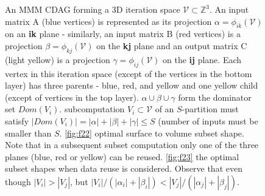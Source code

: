 \documentclass[sigplan,review,anonymous]{acmart}\settopmatter{printfolios=true,printccs=false,printacmref=false}
\begin{document}
\begin{figure}
	\centering
	\hfill
	\hfill
	\caption{\label{fig:f21} An MMM CDAG forming a 3D 
		iteration 
		space $\mathcal{V} \subset \mathbb{Z}^3$. An input 
		matrix A (blue 
		vertices) 
		is represented as 
		its projection $\alpha = \phi_{ik}(\mathcal{V})$
		on 
		an \textbf{ik} plane - similarly, an input matrix B 
		(red vertices) is a 
		projection $\beta = \phi_{kj}(\mathcal{V})$ on the 
		\textbf{kj} plane 
		and an 
		output 
		matrix C (light yellow) 
		is a 
		projection $\gamma = \phi_{ij}(\mathcal{V})$ on the 
		\textbf{ij} plane. 
		Each 
		vertex 
		in this iteration space 
		(except of the vertices in the bottom layer) has 
		three parents - blue, 
		red, 
		and yellow and one yellow child (except of vertices 
		in the top layer). 
		$\alpha \cup \beta \cup \gamma$ form the dominator 
		set $Dom(V_i)$.  
		subcomputation $V_i \subset \mathcal{V}$ of an 
		$S$-partition must 
		satisfy 
		$|Dom(V_i)| = |\alpha| + |\beta| + |\gamma| \le S$ 
		(number of inputs 
		must 
		be 
		smaller than $S$. \ref{fig:f22} 
		optimal surface to volume subset shape. Note that in 
		a subsequent 
		subset computation only one of the three planes 
		(blue, red or yellow) 
		can 
		be reused. \ref{fig:f23} the optimal subset shapes 
		when 
		data reuse is considered. Observe that even though 
		$|V_i| > |V_j|$, but 
		$|V_i|/(|\alpha_i| + |\beta_i|) < |V_j|/(|\alpha_j| + 
		|\beta_j|)$.}
	\label{fig:iterationSpace}
\end{figure}
\end{document}
